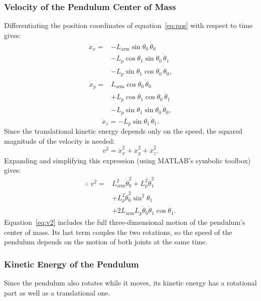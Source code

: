 \documentclass[a4paper,11pt]{article}
\newcommand{\La}{L_{\mathrm{arm}}}
\begin{document}
\subsubsection{Velocity of the Pendulum Center of Mass}
Differentiating the position coordinates of equation~\ref{eq:pos} with respect to time gives:
\begin{equation}
\begin{aligned}
  \dot x_x = {}& -\La \sin\theta_0\,\dot\theta_0\\
  & - L_p \cos\theta_1 \sin\theta_0\,\dot\theta_1\\
  & - L_p \sin\theta_1 \cos\theta_0\,\dot\theta_0 ,
\end{aligned}
\end{equation}
\begin{equation}
\begin{aligned}
  \dot x_y = {}& \La \cos\theta_0\,\dot\theta_0\\
  & + L_p \cos\theta_1 \cos\theta_0\,\dot\theta_1\\
  & - L_p \sin\theta_1 \sin\theta_0\,\dot\theta_0 ,
\end{aligned}
\end{equation}
\begin{equation}
  \dot x_z = -L_p \sin\theta_1\,\dot\theta_1 .
\end{equation}
Since the translational kinetic energy depends only on the speed, the squared magnitude of the velocity is needed:
\begin{equation}
  v^2 = \dot x_x^2 + \dot x_y^2 + \dot x_z^2 .
\end{equation}
Expanding and simplifying this expression (using MATLAB's symbolic toolbox) gives:
\begin{equation}
\begin{aligned}
  \therefore\; v^2 = {}& \La^2 \dot\theta_0^2 + L_p^2 \dot\theta_1^2\\
  & + L_p^2 \dot\theta_0^2 \sin^2\theta_1\\
  & + 2 \La L_p \dot\theta_0 \dot\theta_1 \cos\theta_1 .
\end{aligned}
\label{eq:v2}
\end{equation}
Equation~\ref{eq:v2} includes the full three-dimensional motion of the pendulum's center of mass. Its last term couples the two rotations, so the speed of the pendulum depends on the motion of both joints at the same time.

\subsubsection{Kinetic Energy of the Pendulum}
Since the pendulum also rotates while it moves, its kinetic energy has a rotational part as well as a translational one.
\end{document}
